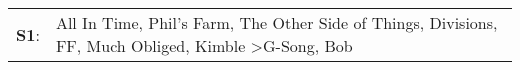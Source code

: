 \begin{supertabular}{p{0.03\textwidth}p{0.92\textwidth}}
 \textbf{S1}:  &  All In Time\textsuperscript{}, \enspace Phil's Farm\textsuperscript{}, \enspace The Other Side of Things\textsuperscript{}, \enspace Divisions\textsuperscript{}, \enspace FF\textsuperscript{}, \enspace Much Obliged\textsuperscript{}, \enspace Kimble\textsuperscript{} \textgreater \enspace G-Song\textsuperscript{}, \enspace Bob\textsuperscript{}  \enspace  \\
\end{supertabular}
